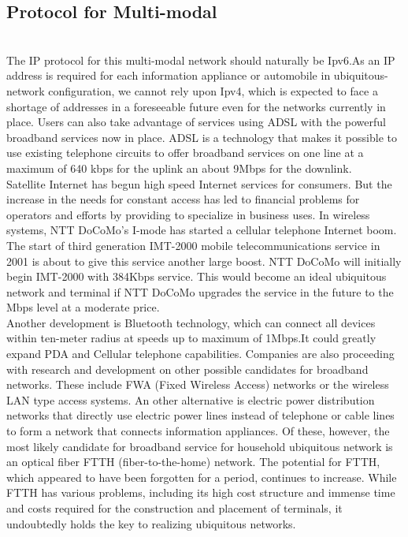 \documentclass[12pt]{report}
\begin{document}
\subsection{Protocol for Multi-modal}\\
\hspace*{0.5in}The IP protocol for this multi-modal network should naturally be Ipv6.As an IP address is required for each information appliance or automobile in ubiquitous-network configuration, we cannot rely upon Ipv4, which is expected to face a shortage of addresses in a foreseeable future even for the networks currently in place. Users can also take advantage of services using ADSL with the powerful broadband services now in place. ADSL is a technology that makes it possible to use existing telephone circuits to offer broadband services on one line at a maximum of 640 kbps for the uplink an about 9Mbps for the downlink. \\\hspace*{0.5in}Satellite Internet has begun high speed Internet services for consumers. But the increase in the needs for constant access has led to financial problems for operators and efforts by providing to specialize in business uses. In wireless systems, NTT DoCoMo's I-mode has started a cellular telephone Internet boom. The start of third generation IMT-2000 mobile telecommunications service in 2001 is about to give this service another large boost. NTT DoCoMo will initially begin IMT-2000 with 384Kbps service. This would become an ideal ubiquitous network and terminal if NTT DoCoMo upgrades the service in the future to the Mbps level at a moderate price.
\\\hspace*{0.5in}Another development is Bluetooth technology, which can connect all devices within ten-meter radius at speeds up to maximum of 1Mbps.It could greatly expand PDA and Cellular telephone capabilities. Companies are also proceeding with research and development on other possible candidates for broadband networks. These include FWA (Fixed Wireless Access) networks or the wireless LAN type access systems. An other alternative is electric power distribution networks that directly use electric power lines instead of telephone or cable lines to form a network that connects information appliances. Of these, however, the most likely candidate for broadband service for household ubiquitous network is an optical fiber FTTH (fiber-to-the-home) network. The potential for FTTH, which appeared to have been forgotten for a period, continues to increase. While FTTH has various problems, including its high cost structure and immense time and costs required for the construction and placement of terminals, it undoubtedly holds the key to realizing ubiquitous networks.
\end{document}
